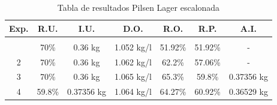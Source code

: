 \begin{longtable}{|p{1cm}|p{1.7cm}|p{2cm}|p{2cm}|p{2cm}| p{1cm}| p{1cm}|}
        \hline
        Exp. %
        & \multicolumn{1}{c|}{R.U.} %
        & \multicolumn{1}{c|}{I.U.} %
        & \multicolumn{1}{c|}{D.O.} %
        & \multicolumn{1}{c|}{R.O.} %
        & \multicolumn{1}{c|}{R.P.} %
        & \multicolumn{1}{c|}{A.I.} %
        \\
        \endfirsthead
        
        \endhead
 
        \endfoot
        
        \hline
        
        \caption{Tabla de resultados Pilsen Lager escalonada\label{tab:ResultadosPilsenEscalonada}}\\
        \endlastfoot
        
        \hline
             \multicolumn{1}{|c|}{1} 
             & \multicolumn{1}{c|}{70\%} 
             & \multicolumn{1}{c|}{0.36 kg}
             & \multicolumn{1}{c|}{1.052 kg/l}
             & \multicolumn{1}{c|}{51.92\%}
             & \multicolumn{1}{c|}{51.92\%} 
             & \multicolumn{1}{c|}{-} \\
             \hline
             
             \multicolumn{1}{|c|}{2} 
             & \multicolumn{1}{c|}{70\%}  
             & \multicolumn{1}{c|}{0.36 kg}
             & \multicolumn{1}{c|}{1.062 kg/l}
             & \multicolumn{1}{c|}{62.2\%}
             & \multicolumn{1}{c|}{57.06\%} 
             & \multicolumn{1}{c|}{-} \\
             \hline
             
             \multicolumn{1}{|c|}{3} 
             & \multicolumn{1}{c|}{70\%} 
             & \multicolumn{1}{c|}{0.36 kg}
             & \multicolumn{1}{c|}{1.065 kg/l}
             & \multicolumn{1}{c|}{65.3\%}
             & \multicolumn{1}{c|}{59.8\%}
             & \multicolumn{1}{c|}{0.37356 kg} \\
             \hline
             
             \multicolumn{1}{|c|}{4} 
             & \multicolumn{1}{c|}{59.8\%}  
             & \multicolumn{1}{c|}{0.37356 kg}
             & \multicolumn{1}{c|}{1.064 kg/l}
             & \multicolumn{1}{c|}{64.27\%}
             & \multicolumn{1}{c|}{60.92\%}
             & \multicolumn{1}{c|}{0.36529 kg} \\
             \hline
             

\end{longtable}
